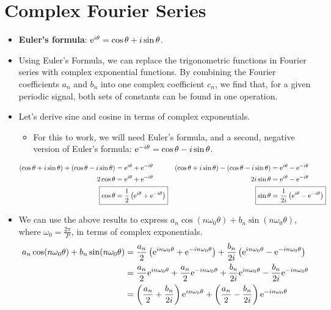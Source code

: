 \documentclass{article}
\begin{document}
\section*{Complex Fourier Series}
\begin{itemize}
    \item {}\textbf{Euler's formula}: $\e[i\theta] = \cos\theta+i\sin\theta$.
    \item Using Euler's Formula, we can replace the trigonometric functions in Fourier series with complex exponential functions. By combining the Fourier coefficients $a_n$ and $b_n$ into one complex coefficient $c_n$, we find that, for a given periodic signal, both sets of constants can be found in one operation.
    \item Let's derive sine and cosine in terms of complex exponentials.
    \begin{itemize}
        \item For this to work, we will need Euler's formula, and a second, negative version of Euler's formula: $\e[-i\theta] = \cos\theta-i\sin\theta$.
    \end{itemize}
    \begin{align*}
        (\cos\theta+i\sin\theta)+(\cos\theta-i\sin\theta) &= \e[i\theta]+\e[-i\theta]&
            (\cos\theta+i\sin\theta)-(\cos\theta-i\sin\theta) &= \e[i\theta]-\e[-i\theta]\\
        2\cos\theta &= \e[i\theta]+\e[-i\theta]&
            2i\sin\theta &= \e[i\theta]-\e[-i\theta]\\
        \Aboxed{\cos\theta &= \frac{1}{2}\left( \e[i\theta]+\e[-i\theta] \right)}&
            \Aboxed{\sin\theta &= \frac{1}{2i}\left( \e[i\theta]-\e[-i\theta] \right)}
    \end{align*}
    \item We can use the above results to express $a_n\cos(n\omega_0\theta)+b_n\sin(n\omega_0\theta)$, where $\omega_0 = \frac{2\pi}{P}$, in terms of complex exponentials.
    \begin{align*}
        a_n\cos(n\omega_0\theta)+b_n\sin(n\omega_0\theta) &= \frac{a_n}{2}\left( \e[in\omega_0\theta]+\e[-in\omega_0\theta] \right)+\frac{b_n}{2i}\left( \e[in\omega_0\theta]-\e[-in\omega_0\theta] \right)\\
        &= \frac{a_n}{2}\e[in\omega_0\theta]+\frac{a_n}{2}\e[-in\omega_0\theta]+\frac{b_n}{2i}\e[in\omega_0\theta]-\frac{b_n}{2i}\e[-in\omega_0\theta]\\
        &= \left( \frac{a_n}{2}+\frac{b_n}{2i} \right)\e[in\omega_0\theta] + \left( \frac{a_n}{2}-\frac{b_n}{2i} \right)\e[-in\omega_0\theta]\\

\end{align*}
\end{itemize}
\end{document}
